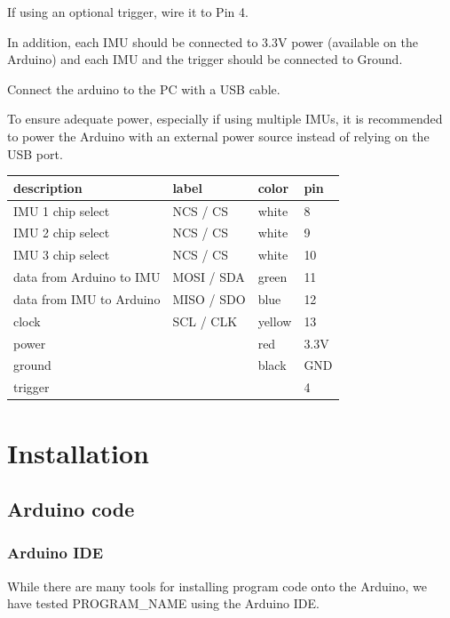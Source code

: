 \documentclass[11pt,letterpaper,article,oneside]{memoir}
\newcommand{\name}{PROGRAM\_NAME}
\begin{document}
If using an optional trigger, wire it to Pin 4.

In addition, each IMU should be connected to 3.3V power (available on the
Arduino) and each IMU and the trigger should be connected to Ground.

Connect the arduino to the PC with a USB cable.

To ensure adequate power, especially if using multiple IMUs, it is recommended
to power the Arduino with an external power source instead of relying on the USB
port.



\begin{table}
\centering
\begin{tabular}{@{}*4l@{}}
\toprule
description & label & color & pin \\
\midrule 
IMU 1 chip select & NCS / CS & white & 8 \\
IMU 2 chip select & NCS / CS & white & 9 \\
IMU 3 chip select & NCS / CS & white & 10 \\
data from Arduino to IMU & MOSI / SDA & green & 11 \\
data from IMU to Arduino & MISO / SDO & blue & 12 \\
clock & SCL / CLK & yellow & 13 \\
power &  & red & 3.3V \\
ground &  & black & GND \\
trigger &  &  & 4 \\
\bottomrule
\end{tabular}
\label{tab:wiring}
\end{table}




\section{Installation}


\subsection{Arduino code}

\subsubsection{Arduino IDE}
While there are many tools for installing program code onto the Arduino, we have
tested \name{} using the Arduino IDE.
\end{document}
